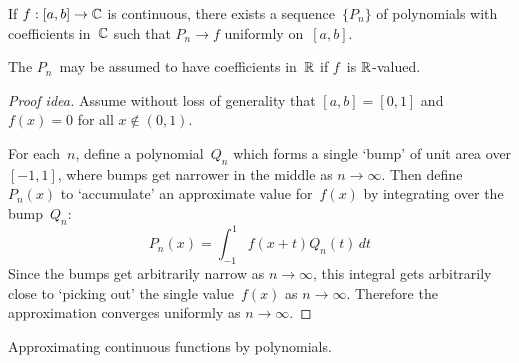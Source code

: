 \begin{thm}[Weierstrass]
If \(f:[a,b]\to\mathbb{C}\) is continuous, there exists a sequence~\(\{P_n\}\) of polynomials with coefficients in~\(\mathbb{C}\) such that \(P_n\to f\) uniformly on~\([a,b]\).

The \(P_n\)~may be assumed to have coefficients in~\(\mathbb{R}\) if \(f\)~is \(\mathbb{R}\)-valued.
\end{thm}
\begin{proof}[Proof idea]
Assume without loss of generality that \([a,b]=[0,1]\) and \(f(x)=0\) for all \(x\not\in(0,1)\).

For each~\(n\), define a polynomial~\(Q_n\) which forms a single `bump' of unit area over \([-1,1]\), where bumps get narrower in the middle as \(n\to\infty\). Then define~\(P_n(x)\) to `accumulate' an approximate value for~\(f(x)\) by integrating over the bump~\(Q_n\):
\[P_n(x)=\int_{-1}^1 f(x+t)Q_n(t)\,dt\]
Since the bumps get arbitrarily narrow as \(n\to\infty\), this integral gets arbitrarily close to `picking out' the single value~\(f(x)\) as \(n\to\infty\). Therefore the approximation converges uniformly as \(n\to\infty\). 
\end{proof}
\begin{app}
Approximating continuous functions by polynomials.
\end{app}

